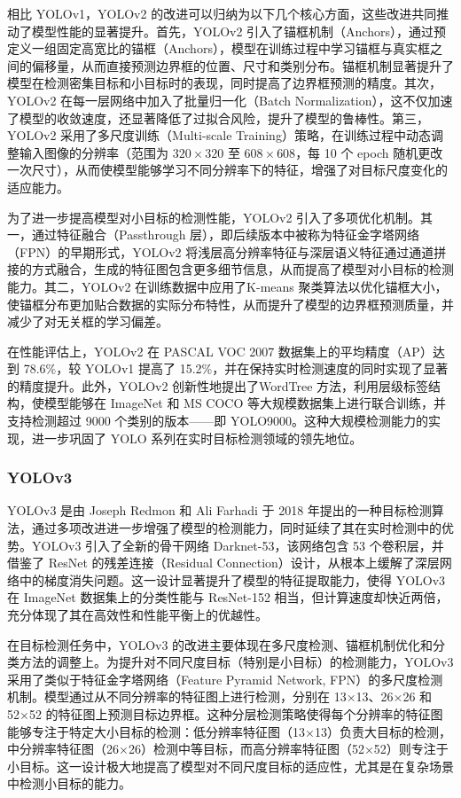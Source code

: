 \documentclass[11pt,twocolumn]{ctexart}
\begin{document}
相比 YOLOv1，YOLOv2 的改进可以归纳为以下几个核心方面，这些改进共同推动了模型性能的显著提升。首先，YOLOv2 引入了锚框机制（Anchors），通过预定义一组固定高宽比的锚框（Anchors），模型在训练过程中学习锚框与真实框之间的偏移量，从而直接预测边界框的位置、尺寸和类别分布。锚框机制显著提升了模型在检测密集目标和小目标时的表现，同时提高了边界框预测的精度。其次，YOLOv2 在每一层网络中加入了批量归一化（Batch Normalization），这不仅加速了模型的收敛速度，还显著降低了过拟合风险，提升了模型的鲁棒性。第三，YOLOv2 采用了多尺度训练（Multi-scale Training）策略，在训练过程中动态调整输入图像的分辨率（范围为 $320 \times 320$ 至 $608 \times 608$，每 10 个 epoch 随机更改一次尺寸），从而使模型能够学习不同分辨率下的特征，增强了对目标尺度变化的适应能力。

为了进一步提高模型对小目标的检测性能，YOLOv2 引入了多项优化机制。其一，通过特征融合（Passthrough 层），即后续版本中被称为特征金字塔网络（FPN）的早期形式，YOLOv2 将浅层高分辨率特征与深层语义特征通过通道拼接的方式融合，生成的特征图包含更多细节信息，从而提高了模型对小目标的检测能力。其二，YOLOv2 在训练数据中应用了K-means 聚类算法以优化锚框大小，使锚框分布更加贴合数据的实际分布特性，从而提升了模型的边界框预测质量，并减少了对无关框的学习偏差。

在性能评估上，YOLOv2 在 PASCAL VOC 2007 数据集上的平均精度（AP）达到 78.6\%，较 YOLOv1 提高了 15.2\%，并在保持实时检测速度的同时实现了显著的精度提升。此外，YOLOv2 创新性地提出了WordTree 方法，利用层级标签结构，使模型能够在 ImageNet 和 MS COCO 等大规模数据集上进行联合训练，并支持检测超过 9000 个类别的版本——即 YOLO9000。这种大规模检测能力的实现，进一步巩固了 YOLO 系列在实时目标检测领域的领先地位。
\subsubsection{YOLOv3}
YOLOv3\cite{farhadi2018yolov3} 是由 Joseph Redmon 和 Ali Farhadi 于 2018 年提出的一种目标检测算法，通过多项改进进一步增强了模型的检测能力，同时延续了其在实时检测中的优势。YOLOv3 引入了全新的骨干网络 Darknet-53，该网络包含 53 个卷积层，并借鉴了 ResNet\cite{he2016deep} 的残差连接（Residual Connection）设计，从根本上缓解了深层网络中的梯度消失问题。这一设计显著提升了模型的特征提取能力，使得 YOLOv3 在 ImageNet 数据集上的分类性能与 ResNet-152 相当，但计算速度却快近两倍，充分体现了其在高效性和性能平衡上的优越性。

在目标检测任务中，YOLOv3 的改进主要体现在多尺度检测、锚框机制优化和分类方法的调整上。为提升对不同尺度目标（特别是小目标）的检测能力，YOLOv3 采用了类似于特征金字塔网络（Feature Pyramid Network, FPN）\cite{lin2017feature}的多尺度检测机制。模型通过从不同分辨率的特征图上进行检测，分别在 13×13、26×26 和 52×52 的特征图上预测目标边界框。这种分层检测策略使得每个分辨率的特征图能够专注于特定大小目标的检测：低分辨率特征图（13×13）负责大目标的检测，中分辨率特征图（26×26）检测中等目标，而高分辨率特征图（52×52）则专注于小目标。这一设计极大地提高了模型对不同尺度目标的适应性，尤其是在复杂场景中检测小目标的能力。
\end{document}
